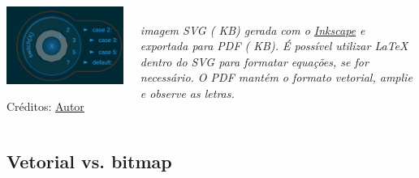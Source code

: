 \documentclass[aspectratio=169]{beamer}
\begin{document}
\begin{frame}[t]\frametitle{\secname}\framesubtitle{\subsecname}
  \begin{columns}[T]
    \begin{column}{9.75cm}
      \includegraphics[width=\columnwidth]{images/pdf/switch.pdf}%
      \par\vspace*{-1.8\baselineskip}\hfill{}\colorbox{base2}{\footnotesize\color{base02}Créditos: \href{https://github.com/roger-willian}{Autor}}
    \end{column}
    \begin{column}{4.25cm}
      \it{}\\
      imagem SVG ( KB) gerada com o \href{https://inkscape.org/}{Inkscape} e exportada para PDF ( KB).
      É possível utilizar \LaTeX{} dentro do SVG para formatar equações, se for necessário.
      O PDF mantém o formato vetorial, amplie e observe as letras.
    \end{column}
  \end{columns}
\end{frame}

\subsection{Vetorial vs. bitmap}
\end{document}
